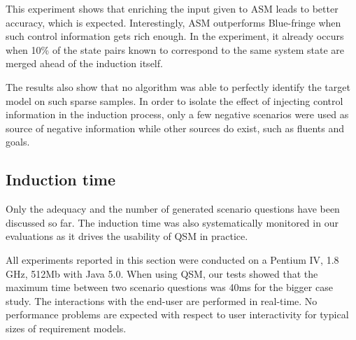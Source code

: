 This experiment shows that enriching the input given to ASM leads to better accuracy, which is expected. Interestingly, ASM outperforms Blue-fringe when such control information gets rich enough. In the experiment, it already occurs when 10\% of the state pairs known to correspond to the same system state are merged ahead of the induction itself.

The results also show that no algorithm was able to perfectly identify the target model on such sparse samples. In order to isolate the effect of injecting control information in the induction process, only a few negative scenarios were used as source of negative information while other sources do exist, such as fluents and goals.


\subsection{Induction time}

Only the adequacy and the number of generated scenario questions have been discussed so far. The induction time was also systematically monitored in our evaluations as it drives the usability of QSM in practice. 

All experiments reported in this section were conducted on a Pentium IV, 1.8 GHz, 512Mb with Java 5.0. When using QSM, our tests showed that the maximum time between two scenario questions was 40ms for the bigger case study. The interactions with the end-user are performed in real-time. No performance problems are expected with respect to user interactivity for typical sizes of requirement models.

